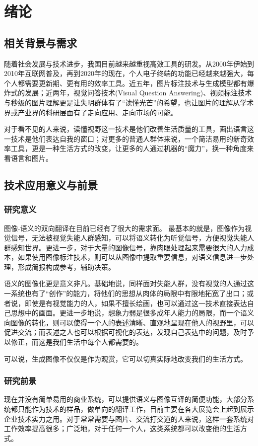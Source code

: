 
\chapter{绪论}

\section{相关背景与需求}
随着社会发展与技术进步，我国目前越来越重视高效工具的研发。从2000年伊始到2010年互联网普及，再到2020年的现在，个人电子终端的功能已经越来越强大，每个人都需要更新期、更有用的效率工具。近五年，图片标注技术与生成模型都有爆炸式的发展；近两年，视觉问答技术(Visual Question Answering)、视频标注技术与秒级的图片理解更是让失明群体有了“读懂光芒”的希望，也让图片的理解从学术界或产业界的科研层面有了走向应用、走向市场的可能。

对于看不见的人来说，读懂视野这一技术是他们改善生活质量的工具，画出语言这一技术是他们表达自我的窗口；对更多的普通人群体来说，一个简洁易用的新奇效率工具，更是一种生活方式的改变，让更多的人通过机器的“魔力”，换一种角度来看语言和图片。

\section{技术应用意义与前景}

\subsection{研究意义}
图像-语义的双向翻译在目前已经有了很大的需求面。
最基本的就是，图像作为视觉信号，无法被视觉失能人群感知，可以将语义转化为听觉信号，方便视觉失能人群感知世界。更进一步，对于大量的图像信号，靠肉眼处理起来需要很大的人力成本，如果使用图像标注技术，则可以从图像中提取重要信息，对语义信息进一步处理，形成简报构成参考，辅助决策。

语义的图像化更是意义非凡。基础地说，同样面对失能人群，没有视觉的人通过这一系统也有了“创作”的能力，将他们的思想从肉体的局限中有限地拓宽了出口；或者说，即使是有视觉能力的人，如果不擅长绘画，也可以通过这一技术直接表达自己思想中的画面。更进一步地说，想象力弱是很多成年人能力的局限，而一个语义向图像的转化，则可以使得一个人的表述清晰、直观地呈现在他人的视野里，可以促进交流；而表述之人也可以根据可视化的表达，发现自己表达中的问题，及时予以修正，而这是我们生活中每个人都需要的。

可以说，生成图像不仅仅是作为观赏，它可以切真实际地改变我们的生活方式。

\subsection{研究前景}
现在并没有简单易用的商业系统，可以提供语义与图像互译的简便功能，大部分系统都只能作为技术的样品，做单向的翻译工作，目前主要在各大展览会上起到展示企业技术实力之用。对于常常需要与图片、交流打交道的人来说，这样一套系统对工作效率提高很多；广泛地，对于任何一个人，这类系统都可以改变他的生活方式。

